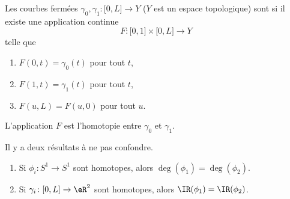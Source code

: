 \begin{definition}     \label{DEFooHJQTooYUFcee}
    Les courbes fermées \( \gamma_0,\gamma_1\colon \mathopen[ 0 , L \mathclose]\to Y\) (\( Y\) est un espace topologique) sont  si il existe une application continue
    \begin{equation}
        F\colon \mathopen[ 0 , 1 \mathclose]\times \mathopen[ 0 , L \mathclose]\to Y
    \end{equation}
    telle que
    \begin{enumerate}
        \item
           \( F(0,t)=\gamma_0(t)\) pour tout \( t\),
       \item
           \( F(1,t)=\gamma_1(t)\) pour tout \( t\),
       \item
           \( F(u,L)=F(u,0)\) pour tout \( u\).
    \end{enumerate}
    L'application \( F\) est l'homotopie entre \( \gamma_0\) et \( \gamma_1\).
\end{definition}

\begin{proposition}      \label{PROPooZIAKooHqtnZj}
    Il y a deux résultats à ne pas confondre.
    \begin{enumerate}
        \item   \label{ITEMooLEHFooXEyTHY}
            Si \( \phi_i\colon S^1\to S^1\) sont homotopes, alors \( \deg(\phi_1)=\deg(\phi_2)\).
        \item
            Si \(\gamma_i\colon \mathopen[ 0 , L \mathclose]\to \eR^2 \) sont homotopes, alors \( \IR(\phi_1)=\IR(\phi_2)\).
    \end{enumerate}
\end{proposition}

